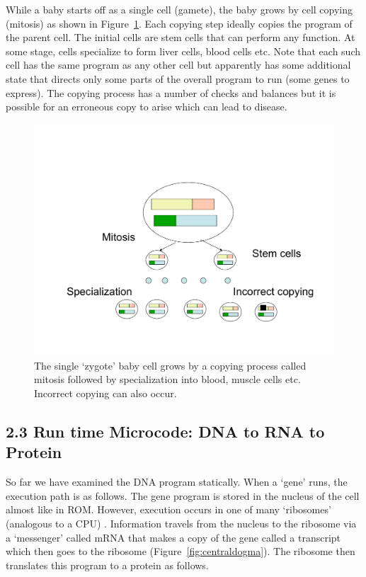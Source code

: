 \documentclass[10pt,fullpage]{article}
\begin{document}
While a baby starts off as a single cell (gamete), the baby grows by
cell copying (mitosis) as shown in Figure~\ref{fig:differentiation}.
Each copying step ideally copies the program of the parent cell.  The
initial cells are stem cells that can perform any function.  At some
stage, cells specialize to form liver cells, blood cells etc.  Note
that each such cell has the same program as any other cell but
apparently has some additional state that directs only some parts of
the overall program to run (some genes to express).  The copying
process has a number of checks and balances but it is possible for an
erroneous copy to arise which can lead to disease.





\begin{figure}[h!]
  \centering
  \includegraphics[trim = 0mm 0mm 0mm 0mm, clip, width=4.5in]{fig/differentiation.pdf}
  \caption{The single `zygote' baby cell grows by a copying process
    called mitosis followed by specialization into blood, muscle cells
    etc.  Incorrect copying can also occur.}
  \label{fig:differentiation}
\end{figure}


\subsection{2.3 Run time Microcode: DNA to RNA to Protein}
\label{sec:genes}
 
So far we have examined the DNA program statically.  When a `gene'
runs, the execution path is as follows.  The gene program is stored in
the nucleus of the cell almost like in ROM.  However, execution occurs
in one of many `ribosomes' (analogous to a CPU) .  Information travels
from the nucleus to the ribosome via a `messenger' called mRNA that
makes a copy of the gene called a transcript which then goes to the
ribosome (Figure~\ref{fig:centraldogma}).  The ribosome then
translates this program to a protein as follows.
\end{document}

